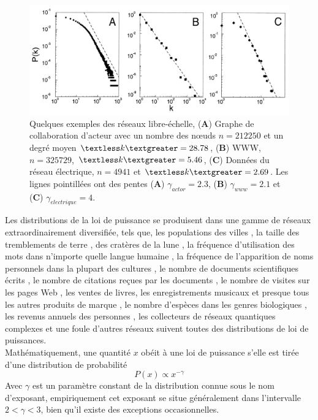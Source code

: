 \begin{figure}[h!]
\centering
\includegraphics[scale=0.3]{./figures/scal-free-reels}
\caption{Quelques exemples des réseaux libre-échelle, (\textbf{A}) Graphe de collaboration d'acteur avec un nombre des nœuds
$n=212250$ et un degré moyen $\textless k\textgreater=28.78$, (\textbf{B}) WWW, $n=325729$, $\textless k\textgreater=5.46$,
(\textbf{C}) Données du réseau électrique, $n=4941$ et $\textless k\textgreater=2.69$. Les lignes pointillées ont des pentes
(\textbf{A}) $\gamma_{actor}=2.3$, (\textbf{B}) $\gamma_{www}=2.1$ et (\textbf{C}) $\gamma_{electrique}=4$.}

\label{scal-free-reels}
\end{figure}
Les distributions de la loi de puissance se produisent dans une gamme de réseaux extraordinairement diversifiée, tels que, les populations des  villes \cite{New2005,Aa-al2009}, la taille des tremblements de terre \cite{GuR1944}, des cratères de la lune  \cite{NeI1994}, la fréquence d'utilisation des mots dans n'importe quelle langue humaine \cite{Zipf1949,Estoup1916}, la  fréquence de l'apparition de noms personnels dans la plupart des cultures \cite{ZaM2001}, le nombre de documents scientifiques écrits \cite{LoW1926}, le nombre de citations reçues par les documents \cite{Price1965}, le nombre de visites sur les pages Web \cite{AdH2000}, les ventes de livres, les enregistrements musicaux et presque tous les autres produits de marque \cite{Cox-al1995}, le nombre d'espèces dans les genres biologiques \cite{WilY1922}, les revenus annuels des personnes \cite{Pareto1896}, les collecteurs de réseaux quantiques complexes \cite{BiR2015} et une foule d'autres réseaux suivent toutes des distributions de loi de puissances.\\

Mathématiquement, une quantité $x$ obéit à une loi de puissance s'elle est tirée d'une distribution de probabilité
\begin{equation}
 P(x)\propto x^{-\gamma}
\end{equation}
Avec $\gamma$ est un paramètre constant de la distribution connue sous le nom d'exposant, empiriquement cet exposant se situe
généralement dans l'intervalle $2<\gamma<3$, bien qu'il existe des exceptions occasionnelles.

